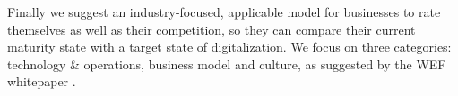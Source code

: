 Finally we suggest an industry-focused, applicable model for businesses to rate themselves as well as their competition, so they can compare their current maturity state with a target state of digitalization. We focus on three categories: technology \& operations, business model and culture, as suggested by the \ac{WEF} whitepaper \cite{worldforumdigitalenterprise:2016}.



